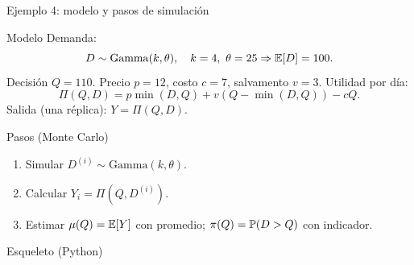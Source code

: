 \documentclass[aspectratio=1610, 9pt]{beamer}
\begin{document}
\begin{frame}[fragile]{Ejemplo 4: modelo y pasos de simulación}
\small
\begin{block}{Modelo}
Demanda:
\[
D\sim\mathrm{Gamma}(k,\theta),\quad k=4,\ \theta=25 \Rightarrow \E[D]=100.
\]
Decisión $Q=110$. Precio $p=12$, costo $c=7$, salvamento $v=3$.
Utilidad por día:
\[
\Pi(Q,D)=p\min(D,Q) + v(Q-\min(D,Q)) - cQ.
\]
Salida (una réplica): $Y=\Pi(Q,D)$.
\end{block}

\begin{block}{Pasos (Monte Carlo)}
\begin{enumerate}
\item Simular $D^{(i)}\sim\mathrm{Gamma}(k,\theta)$.
\item Calcular $Y_i=\Pi(Q,D^{(i)})$.
\item Estimar $\mu(Q)=\mathbb{E}[Y]$ con promedio; $\pi(Q)=\mathbb{P}(D>Q)$ con indicador.
\end{enumerate}
\end{block}

\begin{block}{Esqueleto (Python)}
\end{block}
\end{frame}
\end{document}
